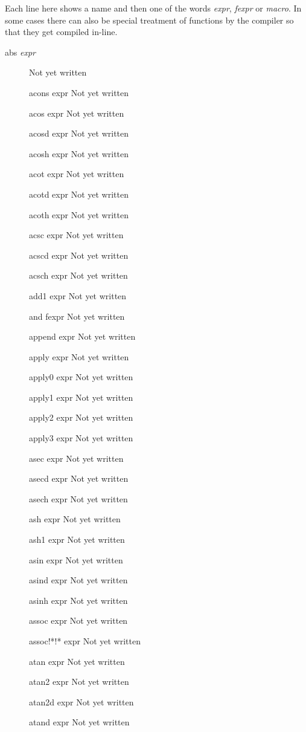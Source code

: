 \documentclass[a4paper,11pt]{article}
\begin{document}
Each line here shows a name and then one of the words {\itshape expr},
{\itshape fexpr} or {\itshape macro}. In some cases there can also be special
treatment of functions by the compiler so that they get compiled in-line.
\begin{description}

\item[{\ttfamily abs} {\itshape expr}]
Not yet written

acons expr
Not yet written

acos expr
Not yet written

acosd expr
Not yet written

acosh expr
Not yet written

acot expr
Not yet written

acotd expr
Not yet written

acoth expr
Not yet written

acsc expr
Not yet written

acscd expr
Not yet written

acsch expr
Not yet written

add1 expr
Not yet written

and fexpr
Not yet written

append expr
Not yet written

apply expr
Not yet written

apply0 expr
Not yet written

apply1 expr
Not yet written

apply2 expr
Not yet written

apply3 expr
Not yet written

asec expr
Not yet written

asecd expr
Not yet written

asech expr
Not yet written

ash expr
Not yet written

ash1 expr
Not yet written

asin expr
Not yet written

asind expr
Not yet written

asinh expr
Not yet written

assoc expr
Not yet written

assoc!*!* expr
Not yet written

atan expr
Not yet written

atan2 expr
Not yet written

atan2d expr
Not yet written

atand expr
Not yet written


\end{description}
\end{document}

